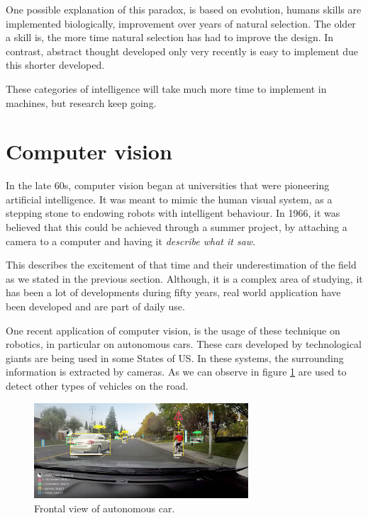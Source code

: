 One possible explanation of this paradox, is based on evolution, humans skills are implemented biologically, improvement over years of natural selection. The older a skill is, the more time natural selection has had to improve the design. In contrast, abstract thought developed only very recently is easy to implement due this shorter developed.

These categories of intelligence will take much more time to implement in machines, but research keep going.

\section{Computer vision}


In the late 60s, computer vision began at universities that were pioneering artificial intelligence. It was meant to mimic the human visual system, as a stepping stone to endowing robots with intelligent behaviour. In 1966, it was believed that this could be achieved through a summer project, by attaching a camera to a computer and having it \textit{describe what it saw}.

This describes the excitement of that time and their underestimation of the field as we stated in the previous section. Although, it is a complex area of studying, it has been a lot of developments during fifty years, real world application have been developed and are part of daily use. 

One recent application of computer vision, is the usage of these technique on robotics, in particular on autonomous cars. These cars developed by technological giants are being used in some States of US. In these systems, the surrounding information is extracted by cameras. As we can observe in figure \ref{intro1} are used to detect other types of vehicles on the road.

\begin{figure}[H]
\centering         
\includegraphics[width=8cm]{aplicaciones/autonomous.jpg}
\caption{Frontal view of autonomous car.} \label{intro1}
\end{figure}



